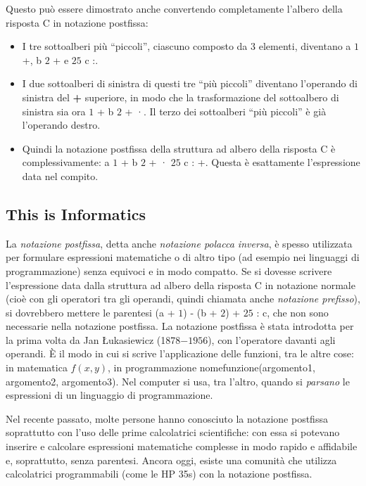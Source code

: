 \documentclass[a4paper,11pt]{report}
\newcommand{\BrochureInlineCode}[1]{{\ttfamily #1}}
\begin{document}
Questo può essere dimostrato anche convertendo completamente l’albero della risposta C in notazione postfissa:

\begin{itemize}
  \item I tre sottoalberi più \enquote{piccoli}, ciascuno composto da $3$ elementi, diventano a $1$ +, b $2$ + e $25$ c :.
  \item I due sottoalberi di sinistra di questi tre \enquote{più piccoli} diventano l’operando di sinistra del \textbf{+} superiore, in modo che la trasformazione del sottoalbero di sinistra sia ora $1$ + b $2$ + ·. Il terzo dei sottoalberi \enquote{più piccoli} è già l’operando destro.
  \item Quindi la notazione postfissa della struttura ad albero della risposta C è complessivamente: a $1$ + b $2$ + · $25$ c : +. Questa è esattamente l’espressione data nel compito.
\end{itemize}


\subsection*{This is Informatics}

La \emph{notazione postfissa}, detta anche \emph{notazione polacca inversa}, è spesso utilizzata per formulare espressioni matematiche o di altro tipo (ad esempio nei linguaggi di programmazione) senza equivoci e in modo compatto. Se si dovesse scrivere l’espressione data dalla struttura ad albero della risposta C in notazione normale (cioè con gli operatori tra gli operandi, quindi chiamata anche \emph{notazione prefisso}), si dovrebbero mettere le parentesi (a + $1$) - (b + $2$) + $25$ : c, che non sono necessarie nella notazione postfissa. La notazione postfissa è stata introdotta per la prima volta da Jan Łukasiewicz (1878$-1956$), con l’operatore davanti agli operandi. È il modo in cui si scrive l’applicazione delle funzioni, tra le altre cose: in matematica ${f(x, y)}$, in programmazione \BrochureInlineCode{nomefunzione(argomento1, argomento2, argomento3)}.  Nel computer si usa, tra l’altro, quando si \emph{parsano} le espressioni di un linguaggio di programmazione.

Nel recente passato, molte persone hanno conosciuto la notazione postfissa soprattutto con l’uso delle prime calcolatrici scientifiche: con essa si potevano inserire e calcolare espressioni matematiche complesse in modo rapido e affidabile e, soprattutto, senza parentesi.  Ancora oggi, esiste una comunità che utilizza calcolatrici programmabili (come le HP 35s) con la notazione postfissa.
\end{document}

